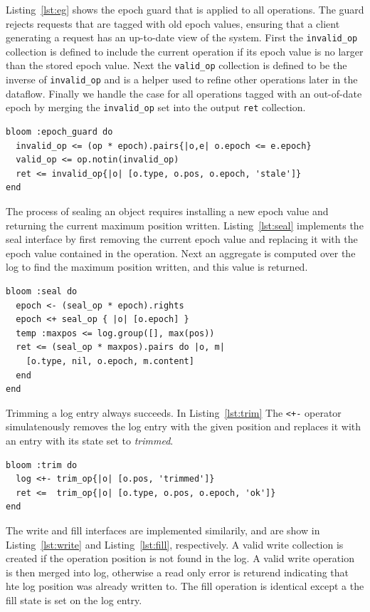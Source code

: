 \documentclass[10pt,twocolumn]{article}
\begin{document}
Listing~\ref{lst:eg} shows the epoch guard that is applied to all operations.
The guard rejects requests that are tagged with old epoch values, ensuring that
a client generating a request has an up-to-date view of the system.  First the
\texttt{invalid\_op} collection is defined to include the current operation if
its epoch value is no larger than the stored epoch value. Next the
\texttt{valid\_op} collection is defined to be the inverse of
\texttt{invalid\_op} and is a helper used to refine other operations later in
the dataflow. Finally we handle the case for all operations tagged with an
out-of-date epoch by merging the \texttt{invalid\_op} set into the output
\texttt{ret} collection.

\begin{lstlisting}[caption={Epoch Guard}, label=lst:eg]
bloom :epoch_guard do
  invalid_op <= (op * epoch).pairs{|o,e| o.epoch <= e.epoch}
  valid_op <= op.notin(invalid_op)
  ret <= invalid_op{|o| [o.type, o.pos, o.epoch, 'stale']}
end
\end{lstlisting}

The process of sealing an object requires installing a new epoch value and
returning the current maximum position written. Listing~\ref{lst:seal} 
implements the seal interface by first removing the current epoch value and
replacing it with the epoch value contained in the operation. Next an aggregate
is computed over the log to find the maximum position written, and this value
is returned.

\begin{lstlisting}[caption={Seal}, label=lst:seal]
bloom :seal do
  epoch <- (seal_op * epoch).rights
  epoch <+ seal_op { |o| [o.epoch] }
  temp :maxpos <= log.group([], max(pos))
  ret <= (seal_op * maxpos).pairs do |o, m|
    [o.type, nil, o.epoch, m.content]
  end
end
\end{lstlisting}

Trimming a log entry always succeeds. In Listing~\ref{lst:trim} The
\texttt{<+-} operator simulatenously removes the log entry with the given 
position and replaces it with an entry with its state set to \emph{trimmed}.

\begin{lstlisting}[caption={Trim}, label=lst:trim]
bloom :trim do
  log <+- trim_op{|o| [o.pos, 'trimmed']}
  ret <=  trim_op{|o| [o.type, o.pos, o.epoch, 'ok']}
end
\end{lstlisting}

The write and fill interfaces are implemented similarily, and are show in
Listing~\ref{lst:write} and Listing~\ref{lst:fill}, respectively.  A valid
write collection is created if the operation position is not found in the log.
A valid write operation is then merged into log, otherwise a read only error is
returend indicating that hte log position was already written to.
The fill operation is identical except a the fill state is set on the log entry.
\end{document}
